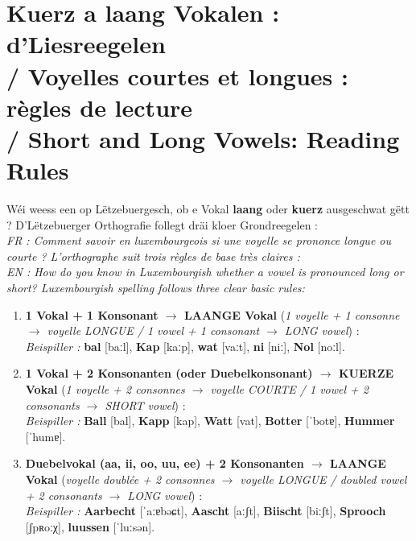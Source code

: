 \section[Kuerz a laang Vokalen : d'Liesreegelen]{Kuerz a laang Vokalen : d'Liesreegelen \\/ Voyelles courtes et longues : règles de lecture \\/ Short and Long Vowels: Reading Rules}

Wéi weess een op Lëtzebuergesch, ob e Vokal \textbf{laang} oder \textbf{kuerz} ausgeschwat gëtt ? D'Lëtzebuerger Orthografie follegt dräi kloer Grondreegelen : \\
\textit{FR : Comment savoir en luxembourgeois si une voyelle se prononce longue ou courte ? L'orthographe suit trois règles de base très claires :} \\
\textit{EN : How do you know in Luxembourgish whether a vowel is pronounced long or short? Luxembourgish spelling follows three clear basic rules:}

\begin{enumerate}
    \item \textbf{1 Vokal + 1 Konsonant $\rightarrow$ LAANGE Vokal} (\textit{1 voyelle + 1 consonne $\rightarrow$ voyelle LONGUE / 1 vowel + 1 consonant $\rightarrow$ LONG vowel}) : \\
    \textit{Beispiller :} \textbf{bal} {[baːl]}, \textbf{Kap} {[kaːp]}, \textbf{wat} {[vaːt]}, \textbf{ni} {[niː]}, \textbf{Nol} {[noːl]}.
    \item \textbf{1 Vokal + 2 Konsonanten (oder Duebelkonsonant) $\rightarrow$ KUERZE Vokal} (\textit{1 voyelle + 2 consonnes $\rightarrow$ voyelle COURTE / 1 vowel + 2 consonants $\rightarrow$ SHORT vowel}) : \\
    \textit{Beispiller :} \textbf{Ball} {[bal]}, \textbf{Kapp} {[kap]}, \textbf{Watt} {[vat]}, \textbf{Botter} {[ˈbotɐ]}, \textbf{Hummer} {[ˈhumɐ]}.
    \item \textbf{Duebelvokal (aa, ii, oo, uu, ee) + 2 Konsonanten $\rightarrow$ LAANGE Vokal} (\textit{voyelle doublée + 2 consonnes $\rightarrow$ voyelle LONGUE / doubled vowel + 2 consonants $\rightarrow$ LONG vowel}) : \\
    \textit{Beispiller :} \textbf{Aarbecht} {[ˈaːɐbəɕt]}, \textbf{Aascht} {[aːʃt]}, \textbf{Biischt} {[biːʃt]}, \textbf{Sprooch} {[ʃpʀoːχ]}, \textbf{luussen} {[ˈluːsən]}.
\end{enumerate}

